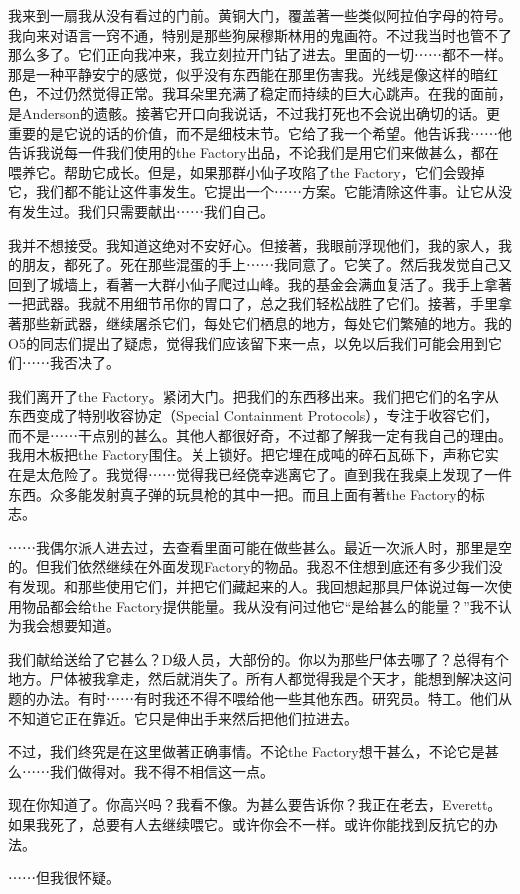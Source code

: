 我来到一扇我从没有看过的门前。黄铜大门，覆盖著一些类似阿拉伯字母的符号。我向来对语言一窍不通，特别是那些狗屎穆斯林用的鬼画符。不过我当时也管不了那么多了。它们正向我冲来，我立刻拉开门钻了进去。里面的一切⋯⋯都不一样。那是一种平静安宁的感觉，似乎没有东西能在那里伤害我。光线是像这样的暗红色，不过仍然觉得正常。我耳朵里充满了稳定而持续的巨大心跳声。在我的面前，是Anderson的遗骸。接著它开口向我说话，不过我打死也不会说出确切的话。更重要的是它说的话的价值，而不是细枝末节。它给了我一个希望。他告诉我⋯⋯他告诉我说每一件我们使用的the Factory出品，不论我们是用它们来做甚么，都在喂养它。帮助它成长。但是，如果那群小仙子攻陷了the Factory，它们会毁掉它，我们都不能让这件事发生。它提出一个⋯⋯方案。它能清除这件事。让它从没有发生过。我们只需要献出⋯⋯我们自己。

我并不想接受。我知道这绝对不安好心。但接著，我眼前浮现他们，我的家人，我的朋友，都死了。死在那些混蛋的手上⋯⋯我同意了。它笑了。然后我发觉自己又回到了城墙上，看著一大群小仙子爬过山峰。我的基金会满血复活了。我手上拿著一把武器。我就不用细节吊你的胃口了，总之我们轻松战胜了它们。接著，手里拿著那些新武器，继续屠杀它们，每处它们栖息的地方，每处它们繁殖的地方。我的O5的同志们提出了疑虑，觉得我们应该留下来一点，以免以后我们可能会用到它们⋯⋯我否决了。

我们离开了the Factory。紧闭大门。把我们的东西移出来。我们把它们的名字从东西变成了特别收容协定（Special Containment Protocols），专注于收容它们，而不是⋯⋯干点别的甚么。其他人都很好奇，不过都了解我一定有我自己的理由。我用木板把the Factory围住。关上锁好。把它埋在成吨的碎石瓦砾下，声称它实在是太危险了。我觉得⋯⋯觉得我已经侥幸逃离它了。直到我在我桌上发现了一件东西。众多能发射真子弹的玩具枪的其中一把。而且上面有著the Factory的标志。

⋯⋯我偶尔派人进去过，去查看里面可能在做些甚么。最近一次派人时，那里是空的。但我们依然继续在外面发现Factory的物品。我忍不住想到底还有多少我们没有发现。和那些使用它们，并把它们藏起来的人。我回想起那具尸体说过每一次使用物品都会给the Factory提供能量。我从没有问过他它“是给甚么的能量？”我不认为我会想要知道。

我们献给送给了它甚么？D级人员，大部份的。你以为那些尸体去哪了？总得有个地方。尸体被我拿走，然后就消失了。所有人都觉得我是个天才，能想到解决这问题的办法。有时⋯⋯有时我还不得不喂给他一些其他东西。研究员。特工。他们从不知道它正在靠近。它只是伸出手来然后把他们拉进去。

不过，我们终究是在这里做著正确事情。不论the Factory想干甚么，不论它是甚么⋯⋯我们做得对。我不得不相信这一点。

现在你知道了。你高兴吗？我看不像。为甚么要告诉你？我正在老去，Everett。如果我死了，总要有人去继续喂它。或许你会不一样。或许你能找到反抗它的办法。

⋯⋯但我很怀疑。
